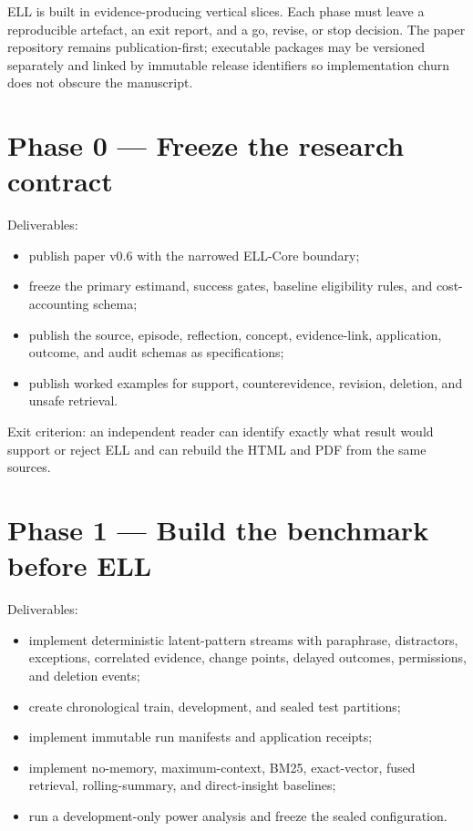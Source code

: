 \documentclass[
  english,
  a4paper,
  DIV=11,
  numbers=noendperiod]{scrreprt}
\providecommand{\tightlist}{%
  \setlength{\itemsep}{0pt}\setlength{\parskip}{0pt}}
\begin{document}
ELL is built in evidence-producing vertical slices. Each phase must
leave a reproducible artefact, an exit report, and a go, revise, or stop
decision. The paper repository remains publication-first; executable
packages may be versioned separately and linked by immutable release
identifiers so implementation churn does not obscure the manuscript.

\section{Phase 0 --- Freeze the research
contract}\label{phase-0-freeze-the-research-contract}

Deliverables:

\begin{itemize}
\tightlist
\item
  publish paper v0.6 with the narrowed ELL-Core boundary;
\item
  freeze the primary estimand, success gates, baseline eligibility
  rules, and cost-accounting schema;
\item
  publish the source, episode, reflection, concept, evidence-link,
  application, outcome, and audit schemas as specifications;
\item
  publish worked examples for support, counterevidence, revision,
  deletion, and unsafe retrieval.
\end{itemize}

Exit criterion: an independent reader can identify exactly what result
would support or reject ELL and can rebuild the HTML and PDF from the
same sources.

\section{Phase 1 --- Build the benchmark before
ELL}\label{phase-1-build-the-benchmark-before-ell}

Deliverables:

\begin{itemize}
\tightlist
\item
  implement deterministic latent-pattern streams with paraphrase,
  distractors, exceptions, correlated evidence, change points, delayed
  outcomes, permissions, and deletion events;
\item
  create chronological train, development, and sealed test partitions;
\item
  implement immutable run manifests and application receipts;
\item
  implement no-memory, maximum-context, BM25, exact-vector, fused
  retrieval, rolling-summary, and direct-insight baselines;
\item
  run a development-only power analysis and freeze the sealed
  configuration.
\end{itemize}
\end{document}
